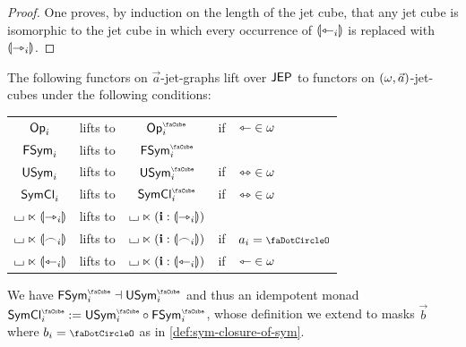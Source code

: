 \documentclass[a4paper]{memoir}
\begin{document}
\begin{proof}
	One proves, by induction on the length of the jet cube, that any jet cube is isomorphic to the jet cube in which every occurrence of ${\llparenthesis \leftarrowtriangle_i \rrparenthesis}$ is replaced with ${\llparenthesis \rightarrowtriangle_i \rrparenthesis}$.
\end{proof}
\begin{proposition} \label{thm:lift-to-jet-cubes}
	The following functors on $\vec a$-jet-graphs lift over $\mathsf{JEP}$ to functors on $(\omega, \vec a)$-jet-cubes under the following conditions:
	\begin{center}
		\begin{tabular}{c c c c l}
			${\mathsf{Op}}_i$ & lifts to & $\Opcube_i$ & if & ${\leftarrowtriangle} \in \omega$ \\
			$\mathsf{FSym}_i$ & lifts to & $\Fsymcube_i$ && \\
			$\mathsf{USym}_i$ & lifts to & $\Usymcube_i$ & if & ${\leftrightarrowtriangle} \in \omega$ \\
			$\mathsf{SymCl}_i$ & lifts to & $\UFsymcube_i$ & if & ${\leftrightarrowtriangle} \in \omega$ \\
			${\llcorner\hspace{-.4ex}\lrcorner} \ltimes {\llparenthesis \rightarrowtriangle_i \rrparenthesis}$ & lifts to & ${\llcorner\hspace{-.4ex}\lrcorner} \ltimes (\mathbf{i} : {\llparenthesis \rightarrowtriangle_i \rrparenthesis})$ && \\
			${\llcorner\hspace{-.4ex}\lrcorner} \ltimes {\llparenthesis \frown_i \rrparenthesis}$ & lifts to & ${\llcorner\hspace{-.4ex}\lrcorner} \ltimes (\mathbf{i} : {\llparenthesis \frown_i \rrparenthesis})$ & if & $a_i = \npolar$ \\
			${\llcorner\hspace{-.4ex}\lrcorner} \ltimes {\llparenthesis \leftarrowtriangle_i \rrparenthesis}$ & lifts to & ${\llcorner\hspace{-.4ex}\lrcorner} \ltimes (\mathbf{i} : {\llparenthesis \leftarrowtriangle_i \rrparenthesis})$ & if & ${\leftarrowtriangle} \in \omega$ \\
		\end{tabular}
	\end{center}
	We have $\Fsymcube_i \dashv \Usymcube_i$ and thus an idempotent monad $\UFsymcube_i := \Usymcube_i \circ \Fsymcube_i$, whose definition we extend to masks $\vec b$ where $b_i = \npolar$ as in \cref{def:sym-closure-of-sym}.
\end{proposition}
\end{document}
